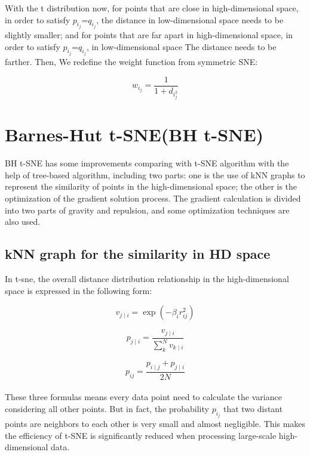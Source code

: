 \noindent With the t distribution now, for points that are close in high-dimensional space, in order to satisfy $p_i_j$=$q_i_j$, the distance in low-dimensional space needs to be slightly smaller; and for points that are far apart in high-dimensional space, in order to satisfy $p_i_j$=$q_i_j$, in low-dimensional space The distance needs to be farther. Then, We redefine the weight function from symmetric SNE: 

\begin{equation*}
    {w_i_j} =  \frac {1}{1+d_i_j^2} 
\end{equation*}

\section{Barnes-Hut t-SNE(BH t-SNE)}

BH t-SNE has some improvements comparing with t-SNE algorithm with the help of tree-based algorithm, including two parts: one is the use of kNN graphs to represent the similarity of points in the high-dimensional space; the other is the optimization of the gradient solution process. The gradient calculation is divided into two parts of gravity and repulsion, and some optimization techniques are also used.

\subsection{kNN graph for the similarity in HD space}

\noindent In t-sne, the overall distance distribution relationship in the high-dimensional space is expressed in the following form:

\begin{equation*}
    {v_{j\mid i}} = \exp {(-\beta_i r^2_{ij})} 
\end{equation*}

\begin{equation*}
    {p_{j\mid i}} = \frac {v_{j\mid i}} {\sum_k^N v_{k\mid i}}
\end{equation*}

\begin{equation*}
    {p_{i j}} = \frac {p_{i\mid j} + p_{j\mid i}} {2N}
\end{equation*}\\

\noindent These three formulas means every data point need to calculate the variance considering all other points. But in fact, the probability $p_i_j$ that two distant points are neighbors to each other is very small and almost negligible. This makes the efficiency of t-SNE is significantly reduced when processing large-scale high-dimensional data.\\

